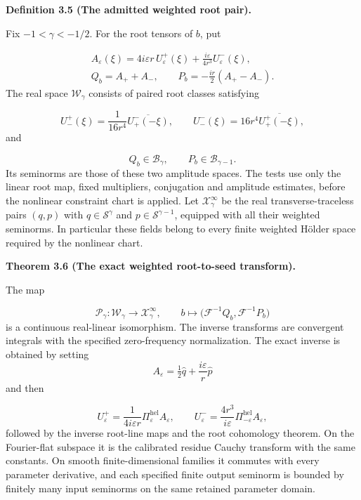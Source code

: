 \documentclass[
  english,
  11pt,
  reqno]{amsart}
\makeatletter
\newcommand{\pandocstatementheading}[1]{%
  \par\addpenalty{\@beginparpenalty}%
  \addvspace{.5\baselineskip plus .2\baselineskip minus .2\baselineskip}%
  {\normalfont\bfseries #1\par}%
  \nobreak\@afterindenttrue\@afterheading
}
\makeatother
\begin{document}
\pandocstatementheading{\leavevmode{}\label{def:online-weighted-root-domain}Definition 3.5 (The admitted weighted root pair).}

Fix \(-1<\gamma<-1/2\). For the root tensors of \(b\), put

\label{eq:online-root-cauchy-amplitudes} \[
\begin{aligned}
A_\varepsilon(\xi)
 =4i\varepsilon r\,U^+_\varepsilon(\xi)
 +\frac{i\varepsilon}{4r^3}U^-_\varepsilon(\xi),\\
Q_b=A_++A_-,\qquad
P_b=-\frac{ir}{2}(A_+-A_-).
\end{aligned}
\] The real space \(\mathscr W_\gamma\) consists of paired root classes
satisfying

\label{eq:online-root-residue-reality} \[
U^+_-(\xi)=\frac1{16r^4}\overline{U^-_+(-\xi)},
\qquad
U^-_-(\xi)=16r^4\overline{U^+_+(-\xi)},
\] and

\label{eq:online-root-weighted-admission} \[
Q_b\in\mathscr B_\gamma,
\qquad
P_b\in\mathscr B_{\gamma-1}.
\] Its seminorms are those of these two amplitude spaces. The tests use
only the linear root map, fixed multipliers, conjugation and amplitude
estimates, before the nonlinear constraint chart is applied. Let
\(\mathcal X^\infty_\gamma\) be the real transverse-traceless pairs
\((q,p)\) with \(q\in\mathscr S^\gamma\) and
\(p\in\mathscr S^{\gamma-1}\), equipped with all their weighted
seminorms. In particular these fields belong to every finite weighted
Hölder space required by the nonlinear chart.

\pandocstatementheading{\leavevmode{}\label{thm:online-root-seed-isomorphism}Theorem 3.6 (The exact weighted root-to-seed transform).}

The map

\label{eq:online-root-seed-transform} \[
\mathscr P_\gamma:\mathscr W_\gamma\longrightarrow\mathcal X^\infty_\gamma,
\qquad
b\longmapsto\bigl(\mathcal F^{-1}Q_b,\mathcal F^{-1}P_b\bigr)
\] is a continuous real-linear isomorphism. The inverse transforms are
convergent integrals with the specified zero-frequency normalization.
The exact inverse is obtained by setting \[
A_\varepsilon=\tfrac12\widehat q+\frac{i\varepsilon}{r}\widehat p
\] and then

\label{eq:online-root-seed-exact-inverse} \[
U^+_\varepsilon
=\frac1{4i\varepsilon r}\Pi^{\mathrm{hel}}_\varepsilon A_\varepsilon,
\qquad
U^-_\varepsilon
=\frac{4r^3}{i\varepsilon}\Pi^{\mathrm{hel}}_{-\varepsilon}A_\varepsilon,
\] followed by the inverse root-line maps and the root cohomology
theorem. On the Fourier-flat subspace it is the calibrated residue
Cauchy transform with the same constants. On smooth finite-dimensional
families it commutes with every parameter derivative, and each specified
finite output seminorm is bounded by finitely many input seminorms on
the same retained parameter domain.
\end{document}
